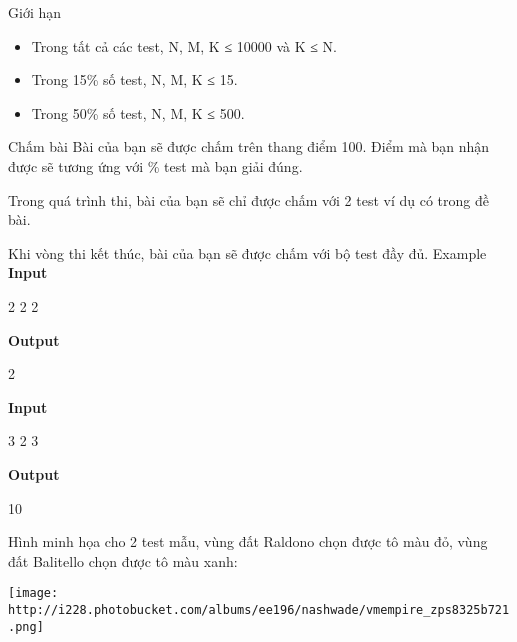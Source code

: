 Giới hạn
\begin{itemize}
	\item     Trong tất cả các test, N, M, K ≤ 10000 và K ≤ N.   
	\item     Trong 15\% số test, N, M, K ≤ 15.   
	\item     Trong 50\% số test, N, M, K ≤ 500.   
\end{itemize}
Chấm bài
Bài của bạn sẽ được chấm trên thang điểm 100. Điểm mà bạn nhận được sẽ tương ứng với \% test mà bạn giải đúng.  

   Trong quá trình thi, bài của bạn sẽ chỉ được chấm với 2 test ví dụ có trong đề bài.  

   Khi vòng thi kết thúc, bài của bạn sẽ được chấm với bộ test đầy đủ.
Example
\textbf{    Input   }

   2 2 2  

\textbf{    Output   }

   2  



\textbf{    Input   }

   3 2 3   \textbf{
\\}

\textbf{    Output   }

   10   \textbf{
\\}



   Hình minh họa cho 2 test mẫu, vùng đất Raldono chọn được tô màu đỏ, vùng đất Balitello chọn được tô màu xanh:   \textbf{
\\}


\texttt{[image: http://i228.photobucket.com/albums/ee196/nashwade/vmempire\_zps8325b721.png]}